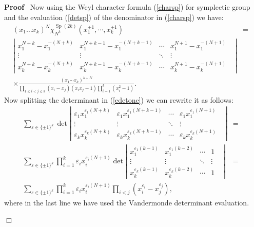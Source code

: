 \documentclass[11pt]{amsart}
\newcommand{\tmop}[1]{\ensuremath{\operatorname{#1}}}
\renewenvironment{proof}{
\noindent\textbf{Proof}\ }{\hspace*{\fill}
\begin{math}\Box\end{math}\medskip}
\begin{document}
\begin{proof}
  Now using the Weyl character formula (\ref{charsp}) for
  symplectic group and the evaluation (\ref{detsp}) of
  the denominator in (\ref{charsp}) we have:
  \begin{eqnarray}
    ( x_1 \ldots x_k )^N \chi_{N^k}^{\tmop{Sp} ( 2 k )} ( x_1^{\pm 1}, \cdots,
    x_k^{\pm 1} ) & = &  \nonumber\\
    \left| \begin{array}{ccccc}
      x_1^{N + k} - x_1^{- ( N + k )} & x_1^{N + k - 1} - x_1^{- ( N + k - 1
      )} & \cdots & x_1^{N + 1} - x_1^{- ( N + 1 )} & \\
      \vdots & \vdots & \ddots & \vdots & \\
      x_k^{N + k} - x_k^{- ( N + k )} & x_k^{N + k - 1} - x_k^{- ( N + k - 1
      )} & \cdots & x_k^{N + 1} - x_k^{- ( N + 1 )} &
    \end{array} \right| &  &  \nonumber\\
    \times \frac{( x_1 \cdots x_k )^{k + N}}{\prod_{1 \leqslant i < j
    \leqslant k} ( x_i - x_j ) ( x_i x_j - 1 ) \prod_{i = 1}^k ( x_i^2 - 1 )}
    . &  &  \label{edetone}
  \end{eqnarray}
  Now splitting the determinant in (\ref{edetone}) we can rewrite it as
  follows:
  \begin{eqnarray*}
    \sum_{\varepsilon \in \{ \pm 1 \}^k} \det \left| \begin{array}{ccccc}
      \varepsilon_1 x_1^{\varepsilon_1 ( N + k )} & \varepsilon_1
      x_1^{\varepsilon_1 ( N + k - 1 )} & \cdots & \varepsilon_1
      x_1^{\varepsilon_1 ( N + 1 )} & \\
      \vdots & \vdots & \ddots & \vdots & \\
      \varepsilon_k x_k^{\varepsilon_k ( N + k )} & \varepsilon_k
      x_k^{\varepsilon_k ( N + k - 1 )} & \cdots & \varepsilon_k
      x_k^{\varepsilon_k ( N + 1 )} &
    \end{array} \right| & = & \\
    \sum_{\varepsilon \in \{ \pm 1 \}^k} \prod_{i = 1}^k \varepsilon_i
    x_i^{\varepsilon_i ( N + 1 )} \det \left| \begin{array}{ccccc}
      x_1^{\varepsilon_1 ( k - 1 )} & x_1^{\varepsilon_1 ( k - 2 )} & \cdots &
      1 & \\
      \vdots & \vdots & \ddots & \vdots & \\
      x_k^{\varepsilon_k ( k - 1 )} & x_k^{\varepsilon_k ( k - 2 )} & \cdots &
      1 &
    \end{array} \right| & = & \\
    \sum_{\varepsilon \in \{ \pm 1 \}^k} \prod_{i = 1}^k \varepsilon_i
    x_i^{\varepsilon_i ( N + 1 )} \prod_{i < j} ( x_i^{\varepsilon_i} -
    x_j^{\varepsilon_j} ), &  &
  \end{eqnarray*}
  where in the last line we have used the Vandermonde determinant evaluation.


\end{proof}
\end{document}
